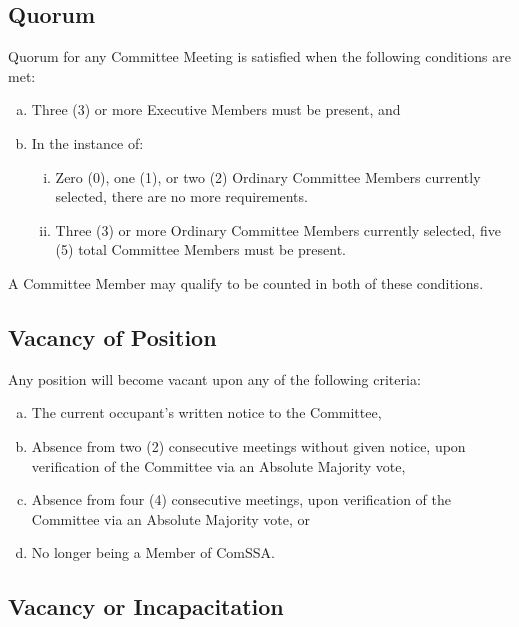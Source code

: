 \documentclass[a4paper,12pt]{article}
\begin{document}
\subsection{Quorum}

Quorum for any Committee Meeting is satisfied when the following conditions are met:

\begin{enumerate}[a)]
	\item Three (3) or more Executive Members must be present, and
	\item In the instance of:
	\begin{enumerate}[i)]
		\item Zero (0), one (1), or two (2) Ordinary Committee Members currently selected, there are no more requirements.
		\item Three (3) or more Ordinary Committee Members currently selected, five (5) total Committee Members must be present.
	\end{enumerate}
\end{enumerate}

A Committee Member may qualify to be counted in both of these conditions.

\subsection{Vacancy of Position}

Any position will become vacant upon any of the following criteria:

\begin{enumerate}[a)]
	\item The current occupant's written notice to the Committee,
	\item Absence from two (2) consecutive meetings without given notice, upon verification of the Committee via an Absolute Majority vote,
	\item Absence from four (4) consecutive meetings, upon verification of the Committee via an Absolute Majority vote, or
	\item No longer being a Member of ComSSA.
\end{enumerate}

\subsection{Vacancy or Incapacitation}
\end{document}
